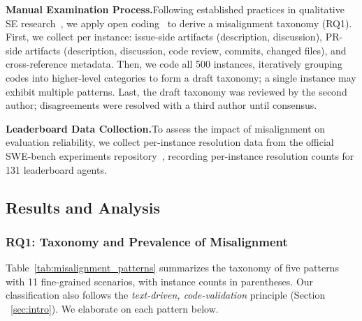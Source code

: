\documentclass[sigconf, review, anonymous]{acmart}
\begin{document}
    \textbf{Manual Examination Process.}\quad Following established                          
  practices in qualitative SE research~\cite{groundedref1,                               
  groundedref2}, we apply open coding~\cite{opencoding} to derive a
  misalignment taxonomy (RQ1). First, we collect per instance: issue-side
  artifacts (description, discussion), PR-side artifacts (description,                     
  discussion, code review, commits, changed files), and cross-reference
  metadata. Then, we code all 500 instances, iteratively grouping codes                     
  into higher-level categories to form a draft taxonomy; a single                        
  instance may exhibit multiple patterns. Last, the draft taxonomy was                           
  reviewed by the second author; disagreements were resolved with a
  third author until consensus.                                                                             
                                                                                           
  \textbf{Leaderboard Data Collection.}\quad To assess the impact of
  misalignment on evaluation reliability, we collect per-instance                    
  resolution data from the official SWE-bench experiments                                
  repository~\cite{sweexperiments}, recording per-instance resolution counts for 131 leaderboard agents. 

    \subsection{Results and Analysis}
    \label{sec:study_results}

    \subsubsection{RQ1: Taxonomy and Prevalence of Misalignment}
    \label{sec:rq1}
    
    Table~\ref{tab:misalignment_patterns} summarizes the taxonomy of five                    
  patterns with 11 fine-grained scenarios, with instance counts in parentheses. Our classification also follows the                  
  \textit{text-driven, code-validation} principle (Section ~\ref{sec:intro}). We elaborate on each pattern below. 
\end{document}
